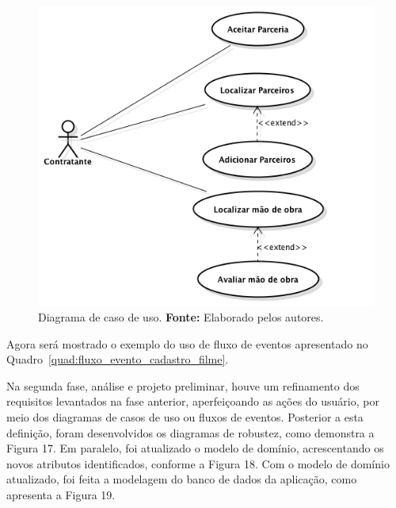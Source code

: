 \begin{figure}[h!]
	\centerline{\includegraphics[scale=0.6]{./imagens/caso-de-uso.png}}
	\caption[Diagrama de caso de uso]
	{Diagrama de caso de uso. \textbf{Fonte:} Elaborado pelos autores.}
	\label{fig:exemplo_test}
\end{figure}

\par Agora será mostrado o exemplo do uso de fluxo de eventos apresentado no Quadro~\ref{quad:fluxo_evento_cadastro_filme}.

\begin{quadro}[h!]
	
	\caption[Fluxo de eventos para o caso de uso criar conta]
	{Fluxo de eventos para o caso de uso criar conta. \textbf{Fonte:} Elaborado pelos autores}
	\label{quad:fluxo_evento_cadastro_filme}
\end{quadro}

\newpage
\par Na segunda fase, análise e projeto preliminar, houve um refinamento dos requisitos levantados na fase anterior, aperfeiçoando as ações do usuário, por meio dos diagramas de casos de uso ou fluxos de eventos. Posterior a esta definição, foram desenvolvidos os diagramas de robustez, como demonstra a Figura 17. Em paralelo, foi atualizado o modelo de domínio, acrescentando os novos atributos identificados, conforme a Figura 18. Com o modelo de domínio atualizado, foi feita a modelagem do banco de dados da aplicação, como apresenta a Figura 19.

